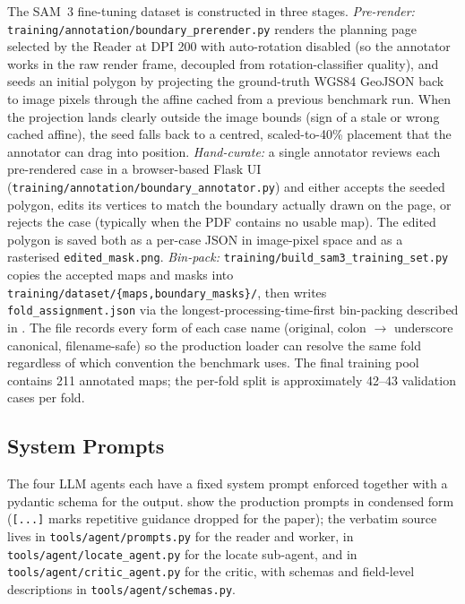 \documentclass[11pt]{article}
\begin{document}
The SAM~3 fine-tuning dataset is constructed in three stages. \emph{Pre-render:} \texttt{training/annotation/boundary\_prerender.py} renders the planning page selected by the Reader at DPI 200 with auto-rotation disabled (so the annotator works in the raw render frame, decoupled from rotation-classifier quality), and seeds an initial polygon by projecting the ground-truth WGS84 GeoJSON back to image pixels through the affine cached from a previous benchmark run. When the projection lands clearly outside the image bounds (sign of a stale or wrong cached affine), the seed falls back to a centred, scaled-to-40\% placement that the annotator can drag into position. \emph{Hand-curate:} a single annotator reviews each pre-rendered case in a browser-based Flask UI (\texttt{training/annotation/boundary\_annotator.py}) and either accepts the seeded polygon, edits its vertices to match the boundary actually drawn on the page, or rejects the case (typically when the PDF contains no usable map). The edited polygon is saved both as a per-case JSON in image-pixel space and as a rasterised \texttt{edited\_mask.png}. \emph{Bin-pack:} \texttt{training/build\_sam3\_training\_set.py} copies the accepted maps and masks into \texttt{training/dataset/\{maps,boundary\_masks\}/}, then writes \texttt{fold\_assignment.json} via the longest-processing-time-first bin-packing described in . The file records every form of each case name (original, colon $\to$ underscore canonical, filename-safe) so the production loader can resolve the same fold regardless of which convention the benchmark uses. The final training pool contains 211 annotated maps; the per-fold split is approximately 42--43 validation cases per fold.

\subsection{System Prompts}
\label{appendix:prompts}

The four LLM agents each have a fixed system prompt enforced together with a pydantic schema for the output.  show the production prompts in condensed form (\texttt{[...]} marks repetitive guidance dropped for the paper); the verbatim source lives in \texttt{tools/agent/prompts.py} for the reader and worker, in \texttt{tools/agent/locate\_agent.py} for the locate sub-agent, and in \texttt{tools/agent/critic\_agent.py} for the critic, with schemas and field-level descriptions in \texttt{tools/agent/schemas.py}.
\end{document}

